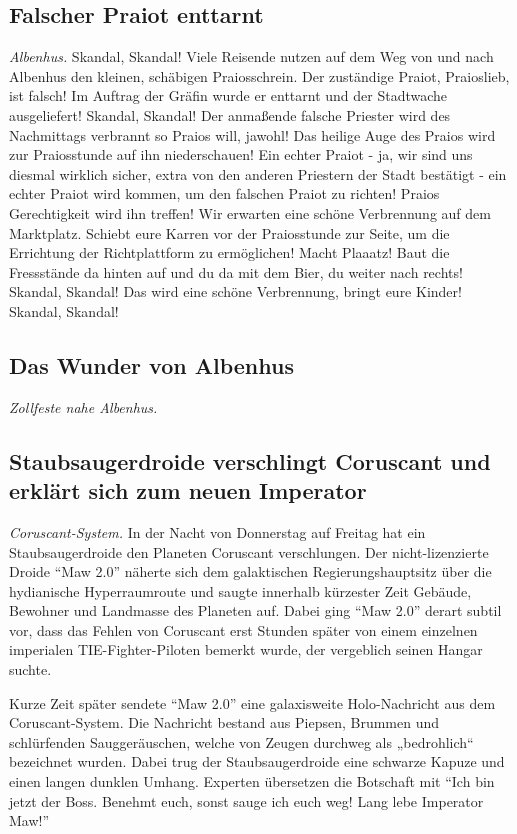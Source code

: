 \documentclass[final]{multiversum}
\begin{document}
\subsection{Falscher Praiot enttarnt}
\textit{Albenhus.} 
Skandal, Skandal!
Viele Reisende nutzen auf dem Weg von und nach Albenhus den kleinen, schäbigen Praiosschrein.
Der zuständige Praiot, Praioslieb, ist falsch!
Im Auftrag der Gräfin wurde er enttarnt und der Stadtwache ausgeliefert!
Skandal, Skandal!
Der anmaßende falsche Priester wird des Nachmittags verbrannt so Praios will, jawohl!
Das heilige Auge des Praios wird zur Praiosstunde auf ihn niederschauen!
Ein echter Praiot - ja, wir sind uns diesmal wirklich sicher, extra von den anderen Priestern der Stadt bestätigt - ein echter Praiot wird kommen, um den falschen Praiot zu richten!
Praios Gerechtigkeit wird ihn treffen!
Wir erwarten eine schöne Verbrennung auf dem Marktplatz.
Schiebt eure Karren vor der Praiosstunde zur Seite, um die Errichtung der Richtplattform zu ermöglichen!
Macht Plaaatz!
Baut die Fressstände da hinten auf und du da mit dem Bier, du weiter nach rechts!
Skandal, Skandal!
Das wird eine schöne Verbrennung, bringt eure Kinder!
Skandal, Skandal!

\subsection{Das Wunder von Albenhus}
\textit{Zollfeste nahe Albenhus.} 

\subsection{Staubsaugerdroide verschlingt Coruscant und erklärt sich zum neuen Imperator}

\textit{Coruscant-System.} 
In der Nacht von Donnerstag auf Freitag hat ein Staubsaugerdroide den Planeten Coruscant verschlungen. 
Der nicht-lizenzierte Droide \enquote{Maw 2.0} näherte sich dem galaktischen Regierungshauptsitz über die hydianische Hyperraumroute und saugte innerhalb kürzester Zeit Gebäude, Bewohner und Landmasse des Planeten auf. 
Dabei ging \enquote{Maw 2.0} derart subtil vor, dass das Fehlen von Coruscant erst Stunden später von einem einzelnen imperialen TIE-Fighter-Piloten bemerkt wurde, der vergeblich seinen Hangar suchte. 

Kurze Zeit später sendete \enquote{Maw 2.0} eine galaxisweite Holo-Nachricht aus dem Coruscant-System. 
Die Nachricht bestand aus Piepsen, Brummen und schlürfenden Sauggeräuschen, welche von Zeugen durchweg als „bedrohlich“ bezeichnet wurden. 
Dabei trug der Staubsaugerdroide eine schwarze Kapuze und einen langen dunklen Umhang. 
Experten übersetzen die Botschaft mit \enquote{Ich bin jetzt der Boss. 
Benehmt euch, sonst sauge ich euch weg! Lang lebe Imperator Maw!}
\end{document}
